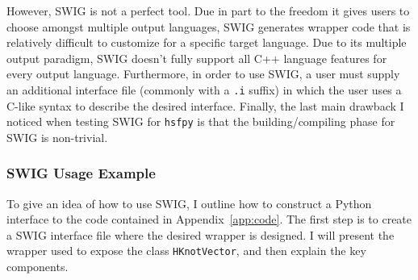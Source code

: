   However, SWIG is not a perfect tool. Due in part to the freedom it gives users to choose amongst multiple output languages, SWIG generates wrapper code that is relatively difficult to customize for a specific target language. Due to its multiple output paradigm, SWIG doesn't fully support all C++ language features for every output language. Furthermore, in order to use SWIG, a user must supply an additional interface file (commonly with a \texttt{.i} suffix) in which the user uses a C-like syntax to describe the desired interface. Finally, the last main drawback I noticed when testing SWIG for \texttt{hsfpy} is that the building/compiling phase for SWIG is non-trivial.  

  \subsubsection{SWIG Usage Example} \label{ssub:swig_usage_example}

    To give an idea of how to use SWIG, I outline how to construct a Python interface to the code contained in Appendix~\ref{app:code}. The first step is to create a SWIG interface file where the desired wrapper is designed. I will present the wrapper used to expose the class \texttt{HKnotVector}, and then explain the key components.

    \vspace{.2in}
    

